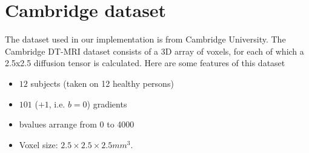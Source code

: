 
\section{Cambridge dataset}
The dataset used in our implementation is from Cambridge University. The Cambridge DT-MRI dataset consists of a 3D array of voxels, for each of which a 2.5x2.5 diffusion tensor is calculated. Here are some features of this dataset
\begin{itemize}
	\item $12$ subjects (taken on 12 healthy persons)
	\item $101$ ($+1$, i.e. $b=0$) gradients
	\item bvalues arrange from 0 to 4000
	\item Voxel size: $2.5 \times 2.5 \times 2.5 mm^3$.
\end{itemize}
